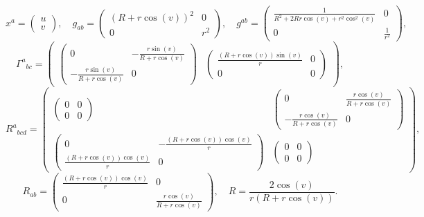 \documentclass[11pt]{article}
\begin{document}
    $$x^{a}=\begin{pmatrix}u\\v\end{pmatrix},\quad g_{ab}=\begin{pmatrix} \left(R + r \cos{\left(v \right)}\right)^{2} & 0\\ 0 & r^{2} \end{pmatrix},\quad g^{ab}=\begin{pmatrix} \frac{1}{R^{2} + 2 R r \cos{\left(v \right)} + r^{2} \cos^{2}{\left(v \right)}} & 0\\ 0 & \frac{1}{r^{2}} \end{pmatrix},$$
$${\Gamma^{a}}_{bc}=\begin{pmatrix} \begin{pmatrix} 0 & - \frac{r \sin{\left(v \right)}}{R + r \cos{\left(v \right)}}\\ - \frac{r \sin{\left(v \right)}}{R + r \cos{\left(v \right)}} & 0 \end{pmatrix} & \begin{pmatrix} \frac{\left(R + r \cos{\left(v \right)}\right) \sin{\left(v \right)}}{r} & 0\\ 0 & 0 \end{pmatrix} \end{pmatrix},$$
$${R^{a}}_{bcd}=\begin{pmatrix} \begin{pmatrix} 0 & 0\\ 0 & 0 \end{pmatrix} & \begin{pmatrix} 0 & \frac{r \cos{\left(v \right)}}{R + r \cos{\left(v \right)}}\\ - \frac{r \cos{\left(v \right)}}{R + r \cos{\left(v \right)}} & 0 \end{pmatrix}\\ \begin{pmatrix} 0 & - \frac{\left(R + r \cos{\left(v \right)}\right) \cos{\left(v \right)}}{r}\\ \frac{\left(R + r \cos{\left(v \right)}\right) \cos{\left(v \right)}}{r} & 0 \end{pmatrix} & \begin{pmatrix} 0 & 0\\ 0 & 0 \end{pmatrix} \end{pmatrix},$$
$$R_{ab}=\begin{pmatrix} \frac{\left(R + r \cos{\left(v \right)}\right) \cos{\left(v \right)}}{r} & 0\\ 0 & \frac{r \cos{\left(v \right)}}{R + r \cos{\left(v \right)}} \end{pmatrix},\quad R=\frac{2 \cos{\left(v \right)}}{r \left(R + r \cos{\left(v \right)}\right)}.$$
\end{document}
